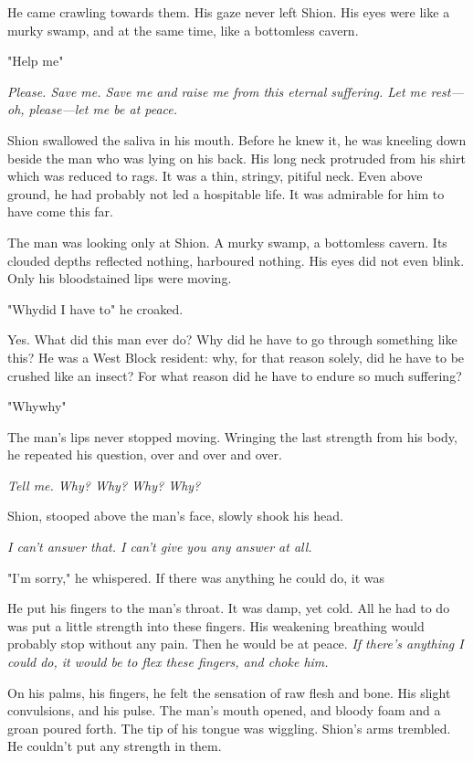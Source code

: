 He came crawling towards them. His gaze never left Shion. His eyes were
like a murky swamp, and at the same time, like a bottomless cavern.

"Help me\el "

\emph{Please. Save me. Save me and raise me from this eternal suffering. Let
me rest---oh, please---let me be at peace.}

Shion swallowed the saliva in his mouth. Before he knew it, he was
kneeling down beside the man who was lying on his back. His long neck
protruded from his shirt which was reduced to rags. It was a thin,
stringy, pitiful neck. Even above ground, he had probably not led a
hospitable life. It was admirable for him to have come this far.

The man was looking only at Shion. A murky swamp, a bottomless cavern.
Its clouded depths reflected nothing, harboured nothing. His eyes did
not even blink. Only his bloodstained lips were moving.

"Why\el did I have to\el " he croaked.

Yes. What did this man ever do? Why did he have to go through something
like this? He was a West Block resident: why, for that reason solely,
did he have to be crushed like an insect? For what reason did he have to
endure so much suffering?

"Why\el why\el "

The man's lips never stopped moving. Wringing the last strength from his
body, he repeated his question, over and over and over.

\emph{Tell me. Why? Why? Why? Why?}

Shion, stooped above the man's face, slowly shook his head.

\emph{I can't answer that. I can't give you any answer at all.}

"I'm sorry," he whispered. If there was anything he could do, it was\el 

He put his fingers to the man's throat. It was damp, yet cold. All he
had to do was put a little strength into these fingers. His weakening
breathing would probably stop without any pain. Then he would be at
peace. \emph{If there's anything I could do, it would be to flex these
fingers, and choke him.}

On his palms, his fingers, he felt the sensation of raw flesh and bone.
His slight convulsions, and his pulse. The man's mouth opened, and
bloody foam and a groan poured forth. The tip of his tongue was
wiggling. Shion's arms trembled. He couldn't put any strength in them.

